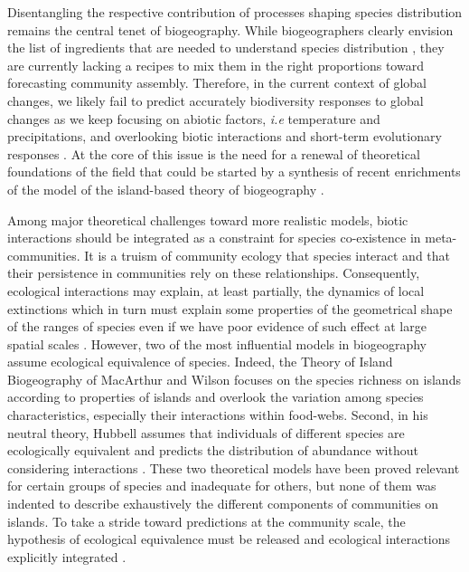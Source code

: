 Disentangling the respective contribution of processes shaping species
distribution remains the central tenet of biogeography. While
biogeographers clearly envision the list of ingredients that are needed
to understand species distribution \citep{Thuiller2013}, they are
currently lacking a recipes to mix them in the right proportions toward
forecasting community assembly. Therefore, in the current context of
global changes, we likely fail to predict accurately biodiversity
responses to global changes as we keep focusing on abiotic factors,
\emph{i.e} temperature and precipitations, and overlooking biotic
interactions and short-term evolutionary responses \citep{Lavergne2010}.
At the core of this issue is the need for a renewal of theoretical
foundations of the field that could be started by a synthesis of recent
enrichments of the model of the island-based theory of biogeography
\citep{Lomolino2000a, Warren2015}.

Among major theoretical challenges toward more realistic models, biotic
interactions should be integrated as a constraint for species
co-existence in meta-communities. It is a truism of community ecology
that species interact and that their persistence in communities rely on
these relationships. Consequently, ecological interactions may explain,
at least partially, the dynamics of local extinctions which in turn must
explain some properties of the geometrical shape of the ranges of
species \citep{Holt2009, Cazelles2015a} even if we have poor evidence of
such effect at large spatial scales \citep[but see][]{Gotelli2010}.
However, two of the most influential models in biogeography assume
ecological equivalence of species. Indeed, the Theory of Island
Biogeography of MacArthur and Wilson \citep[hereafter
TIB,][]{MacArthur1967} focuses on the species richness on islands
according to properties of islands and overlook the variation among
species characteristics, especially their interactions within food-webs.
Second, in his neutral theory, Hubbell assumes that individuals of
different species are ecologically equivalent and predicts the
distribution of abundance without considering interactions
\citep{Hubbell1997}. These two theoretical models have been proved
relevant for certain groups of species and inadequate for others, but
none of them was indented to describe exhaustively the different
components of communities on islands. To take a stride toward
predictions at the community scale, the hypothesis of ecological
equivalence must be released and ecological interactions explicitly
integrated \citep{Holt2010, Gravel2011}.

